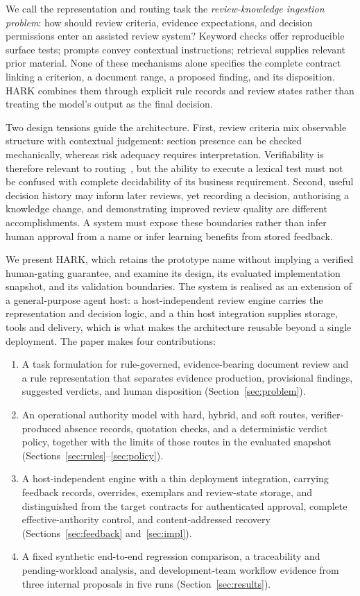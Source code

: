 \documentclass[computers,article,submit,moreauthors]{Definitions/mdpi}
\begin{document}
We call the representation and routing task the \emph{review-knowledge ingestion problem}: how should review criteria, evidence expectations, and decision permissions enter an assisted review system? Keyword checks offer reproducible surface tests; prompts convey contextual instructions; retrieval supplies relevant prior material. None of these mechanisms alone specifies the complete contract linking a criterion, a document range, a proposed finding, and its disposition. HARK combines them through explicit rule records and review states rather than treating the model's output as the final decision.

Two design tensions guide the architecture. First, review criteria mix observable structure with contextual judgement: section presence can be checked mechanically, whereas risk adequacy requires interpretation. Verifiability is therefore relevant to routing~\cite{iso29148,genova2013}, but the ability to execute a lexical test must not be confused with complete decidability of its business requirement. Second, useful decision history may inform later reviews, yet recording a decision, authorising a knowledge change, and demonstrating improved review quality are different accomplishments. A system must expose these boundaries rather than infer human approval from a name or infer learning benefits from stored feedback.

We present HARK, which retains the prototype name without implying a verified human-gating guarantee, and examine its design, its evaluated implementation snapshot, and its validation boundaries. The system is realised as an extension of a general-purpose agent host: a host-independent review engine carries the representation and decision logic, and a thin host integration supplies storage, tools and delivery, which is what makes the architecture reusable beyond a single deployment. The paper makes four contributions:

\begin{enumerate}[label=(\arabic*),leftmargin=*]
\item A task formulation for rule-governed, evidence-bearing document review and a rule representation that separates evidence production, provisional findings, suggested verdicts, and human disposition (Section~\ref{sec:problem}).
\item An operational authority model with hard, hybrid, and soft routes, verifier-produced absence records, quotation checks, and a deterministic verdict policy, together with the limits of those routes in the evaluated snapshot (Sections~\ref{sec:rules}--\ref{sec:policy}).
\item A host-independent engine with a thin deployment integration, carrying feedback records, overrides, exemplars and review-state storage, and distinguished from the target contracts for authenticated approval, complete effective-authority control, and content-addressed recovery (Sections~\ref{sec:feedback} and~\ref{sec:impl}).
\item A fixed synthetic end-to-end regression comparison, a traceability and pending-workload analysis, and development-team workflow evidence from three internal proposals in five runs (Section~\ref{sec:results}).
\end{enumerate}
\end{document}
